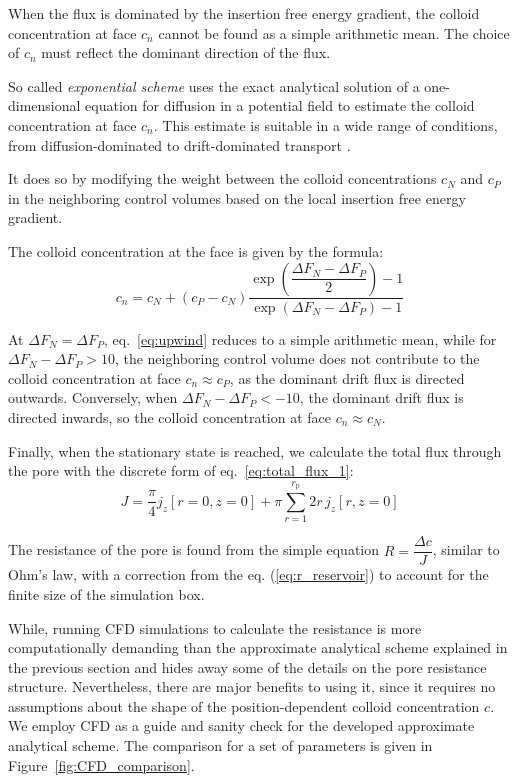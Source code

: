 \documentclass[10pt, a4paper]{article}
\begin{document}
\begin{multicols}{2}
When the flux is dominated by the insertion free energy gradient, the colloid concentration at face $c_n$ cannot be found as a simple arithmetic mean.
The choice of $c_n$ must reflect the dominant direction of the flux.

So called \emph{exponential scheme} uses the exact analytical solution of a one-dimensional equation for diffusion in a potential field to estimate the colloid concentration at face $c_n$.
This estimate is suitable in a wide range of conditions, from diffusion-dominated to drift-dominated transport \cite{Patankar1980,Versteeg2007}.

It does so by modifying the weight between the colloid concentrations $c_N$ and $c_P$ in the neighboring control volumes based on the local insertion free energy gradient.

The colloid concentration at the face is given by the formula:
\begin{equation}
    \label{eq:upwind}
    c_n = c_N + (c_P - c_N) \frac{\exp\left( \dfrac{\Delta F_N - \Delta F_P}{2} \right) - 1}{\exp\left( \Delta F_N - \Delta F_P \right) - 1}
\end{equation}

At $\Delta F_N = \Delta F_P$, eq.~\ref{eq:upwind} reduces to a simple arithmetic mean, while for $\Delta F_N - \Delta F_P > 10$, the neighboring control volume does not contribute to the colloid concentration at face $c_n \approx c_P$, as the dominant drift flux is directed outwards.
Conversely, when $\Delta F_N - \Delta F_P < -10$, the dominant drift flux is directed inwards, so the colloid concentration at face $c_n \approx c_N$.




Finally, when the stationary state is reached, we calculate the total flux through the pore with the discrete form of eq.~\ref{eq:total_flux_1}:
\begin{equation}
    \label{eq:total_flux_2}
    J = \frac{\pi}{4} j_z[ r = 0, z = 0 ] + \pi \sum_{r = 1}^{r_{\text{p}}} 2 r \, j_z[ r, z = 0 ]
\end{equation}

The resistance of the pore is found from the simple equation $R = \dfrac{\Delta c}{J}$, similar to Ohm's law, with a correction from the eq. (\ref{eq:r_reservoir}) to account for the finite size of the simulation box.

While, running CFD simulations to calculate the resistance is more computationally demanding than the approximate analytical scheme explained in the previous section and hides away some of the details on the pore resistance structure.
Nevertheless, there are major benefits to using it, since it requires no assumptions about the shape of the position-dependent colloid concentration $c$.
We employ CFD as a guide and sanity check for the developed approximate analytical scheme.
The comparison for a set of parameters is given in Figure~\ref{fig:CFD_comparison}.


\end{multicols}
\end{document}
